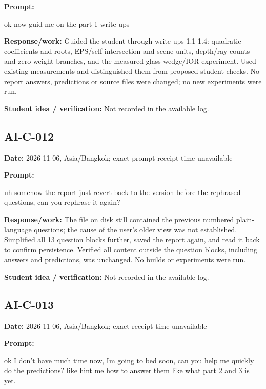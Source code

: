 \documentclass[11pt,a4paper]{article}
\begin{document}
\noindent\textbf{Prompt:}
\begin{prompt}
ok now guid me on the part 1 write ups
\end{prompt}
\noindent\textbf{Response/work:} Guided the student through write-ups 1.1-1.4: quadratic coefficients and roots, EPS/\allowbreak{}self-intersection and scene units, depth/\allowbreak{}ray counts and zero-weight branches, and the measured glass-wedge/\allowbreak{}IOR experiment. Used existing measurements and distinguished them from proposed student checks. No report answers, predictions or source files were changed; no new experiments were run.\par
\noindent\textbf{Student idea / verification:} Not recorded in the available log.\par\medskip
{}\subsection*{AI-C-012}
\noindent\textbf{Date:} 2026-11-06, Asia/\allowbreak{}Bangkok; exact prompt receipt time unavailable\par
\noindent\textbf{Prompt:}
\begin{prompt}
uh somehow the report just revert back to the version before the rephrased questions, can
 you rephrase it again?
\end{prompt}
\noindent\textbf{Response/work:} The file on disk still contained the previous numbered plain-language questions; the cause of the user's older view was not established. Simplified all 13 question blocks further, saved the report again, and read it back to confirm persistence. Verified all content outside the question blocks, including answers and predictions, was unchanged. No builds or experiments were run.\par
\noindent\textbf{Student idea / verification:} Not recorded in the available log.\par\medskip
{}\subsection*{AI-C-013}
\noindent\textbf{Date:} 2026-11-06, Asia/\allowbreak{}Bangkok; exact receipt time unavailable\par
\noindent\textbf{Prompt:}
\begin{prompt}
ok I don't have much time now, Im going to bed soon, can you help me quickly do the
predictions? like hint me how to answer them like what part 2 and 3 is yet.
\end{prompt}
\end{document}
